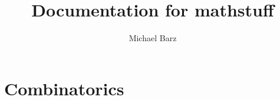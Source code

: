 \documentclass{article}
\title{Documentation for mathstuff}
\author{Michael Barz}
\date{ }
\begin{document}
\section{Combinatorics}


\end{document}
